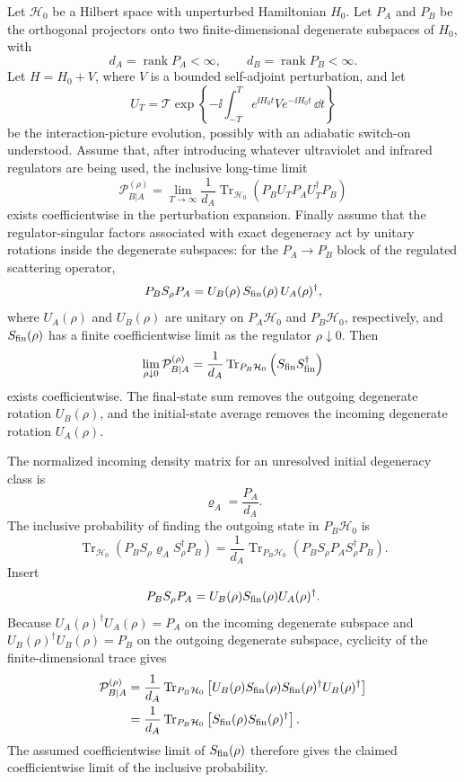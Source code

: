 \begin{remark}
\label{rem:finite-degeneracy-kln-trace-identity}
Let \(\mathcal H_0\) be a Hilbert space with unperturbed Hamiltonian \(H_0\).
Let \(P_A\) and \(P_B\) be the orthogonal projectors onto two
finite-dimensional degenerate subspaces of \(H_0\), with
\[
  d_A=\operatorname{rank}P_A<\infty,\qquad
  d_B=\operatorname{rank}P_B<\infty .
\]
Let \(H=H_0+V\), where \(V\) is a bounded self-adjoint perturbation, and let
\[
  U_T
  =
  \mathcal T\exp\left\{-\ii\int_{-T}^{T}
    e^{\ii H_0t}V e^{-\ii H_0t}\,\dd t\right\}
\]
be the interaction-picture evolution, possibly with an adiabatic switch-on
understood.  Assume that, after introducing whatever ultraviolet and infrared
regulators are being used, the inclusive long-time limit
\[
  \mathcal P^{(\rho)}_{B|A}
  =
  \lim_{T\to\infty}
  \frac{1}{d_A}\operatorname{Tr}_{\mathcal H_0}
  \left(P_B U_T P_A U_T^\dagger P_B\right)
\]
exists coefficientwise in the perturbation expansion.  Finally assume that
the regulator-singular factors associated with exact degeneracy act by
unitary rotations inside the degenerate subspaces: for the
\(P_A\to P_B\) block of the regulated scattering operator,
\[
  P_B S_\rho P_A
  =
  U_B(\rho)\,S_{\rm fin}(\rho)\,U_A(\rho)^\dagger ,
\]
where \(U_A(\rho)\) and \(U_B(\rho)\) are unitary on \(P_A\mathcal H_0\) and
\(P_B\mathcal H_0\), respectively, and \(S_{\rm fin}(\rho)\) has a finite
coefficientwise limit as the regulator \(\rho\downarrow0\).  Then
\[
  \lim_{\rho\downarrow0}\mathcal P^{(\rho)}_{B|A}
  =
  \frac{1}{d_A}
  \operatorname{Tr}_{P_B\mathcal H_0}
  \left(S_{\rm fin}S_{\rm fin}^\dagger\right)
\]
exists coefficientwise.  The final-state sum removes the outgoing
degenerate rotation \(U_B(\rho)\), and the initial-state average removes the
incoming degenerate rotation \(U_A(\rho)\).

The normalized incoming density matrix for an unresolved initial degeneracy
class is
\[
  \varrho_A=\frac{P_A}{d_A}.
\]
The inclusive probability of finding the outgoing state in \(P_B\mathcal H_0\)
is
\[
  \operatorname{Tr}_{\mathcal H_0}
  \left(P_B S_\rho \varrho_A S_\rho^\dagger P_B\right)
  =
  \frac1{d_A}
  \operatorname{Tr}_{P_B\mathcal H_0}
  \left(
    P_B S_\rho P_A S_\rho^\dagger P_B
  \right).
\]
Insert
\[
  P_B S_\rho P_A
  =
  U_B(\rho)S_{\rm fin}(\rho)U_A(\rho)^\dagger .
\]
Because \(U_A(\rho)^\dagger U_A(\rho)=P_A\) on the incoming degenerate
subspace and \(U_B(\rho)^\dagger U_B(\rho)=P_B\) on the outgoing degenerate
subspace, cyclicity of the finite-dimensional trace gives
\[
\begin{aligned}
  \mathcal P^{(\rho)}_{B|A}
  &=
  \frac1{d_A}
  \operatorname{Tr}_{P_B\mathcal H_0}
  \left[
    U_B(\rho)S_{\rm fin}(\rho)
    S_{\rm fin}(\rho)^\dagger U_B(\rho)^\dagger
  \right]
\\
  &=
  \frac1{d_A}
  \operatorname{Tr}_{P_B\mathcal H_0}
  \left[
    S_{\rm fin}(\rho)S_{\rm fin}(\rho)^\dagger
  \right].
\end{aligned}
\]
The assumed coefficientwise limit of \(S_{\rm fin}(\rho)\) therefore gives the
claimed coefficientwise limit of the inclusive probability.
\end{remark}

